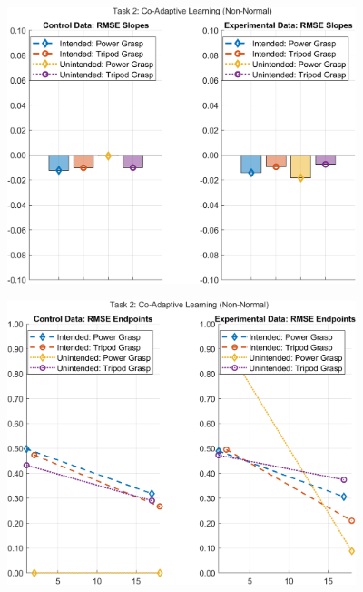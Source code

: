 \documentclass[12pt]{article}
\newcommand\figWidth{4in}
\begin{document}
    \begin{figure}
        \includegraphics[width = \figWidth]{t2-bar-xnorm.png}
    \end{figure}
    \begin{figure}
        \includegraphics[width = \figWidth]{t2-spaghetti-xnorm.png}
    \end{figure}
    \newpage \clearpage
\end{document}
